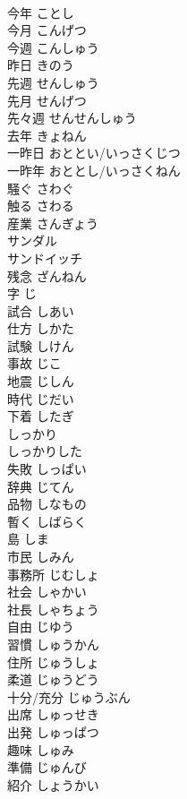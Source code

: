 \documentclass[8pt]{extreport}
\begin{document}
\begin{CJK}{UTF8}{min}
\\	今年	ことし	
\\	今月	こんげつ	
\\	今週	こんしゅう	
\\	昨日	きのう	
\\	先週	せんしゅう	
\\	先月	せんげつ	
\\	先々週	せんせんしゅう	
\\	去年	きょねん	
\\	一昨日	おととい/いっさくじつ	
\\	一昨年	おととし/いっさくねん	
\\	騒ぐ	さわぐ	
\\	触る	さわる	
\\	産業	さんぎょう	
\\	サンダル		
\\	サンドイッチ		
\\	残念	ざんねん	
\\	字	じ	
\\	試合	しあい	
\\	仕方	しかた	
\\	試験	しけん	
\\	事故	じこ	
\\	地震	じしん	
\\	時代	じだい	
\\	下着	したぎ	
\\	しっかり		
\\	しっかりした		
\\	失敗	しっぱい	
\\	辞典	じてん	
\\	品物	しなもの	
\\	暫く	しばらく	
\\	島	しま	
\\	市民	しみん	
\\	事務所	じむしょ	
\\	社会	しゃかい	
\\	社長	しゃちょう	
\\	自由	じゆう	
\\	習慣	しゅうかん	
\\	住所	じゅうしょ	
\\	柔道	じゅうどう	
\\	十分/充分	じゅうぶん	
\\	出席	しゅっせき	
\\	出発	しゅっぱつ	
\\	趣味	しゅみ	
\\	準備	じゅんび	
\\	紹介	しょうかい	

\end{CJK}
\end{document}
